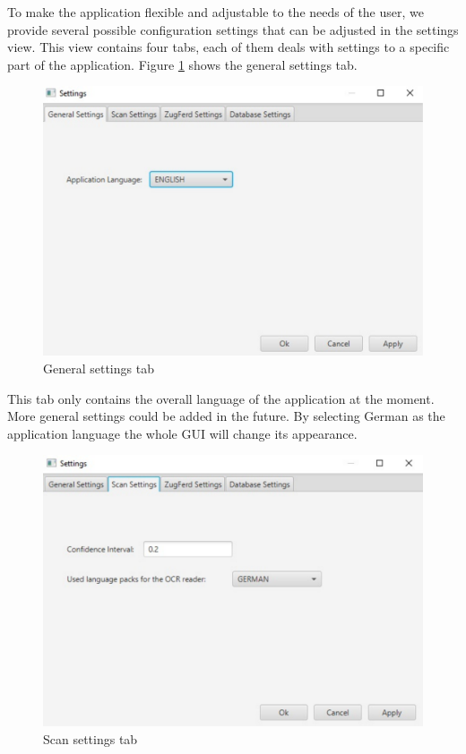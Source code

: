 To make the application flexible and adjustable to the needs of the user, we provide several possible configuration settings that can be adjusted in the settings view. This view contains four tabs, each of them deals with settings to a specific part of the application.
Figure \ref{settings_General} shows the general settings tab. 

\begin{figure}[ht!]
\centering
\includegraphics[scale=0.6,natwidth=210,natheight=149]{Images/GUI/settings_General.pdf}
\caption{General settings tab \label{settings_General}}
\end{figure}

This tab only contains the overall language of the application at the moment. More general settings could be added in the future. By selecting German as the application language the whole GUI will change its appearance.

\begin{figure}[ht!]
\centering
\includegraphics[scale=0.6,natwidth=211,natheight=151]{Images/GUI/settings_Scan.pdf}
\caption{Scan settings tab \label{settings_Scan}}
\end{figure}

